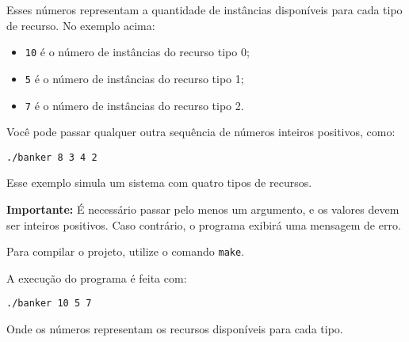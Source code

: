 \documentclass[12pt]{article}
\begin{document}
Esses números representam a quantidade de instâncias disponíveis para cada tipo de recurso. No exemplo acima:

\begin{itemize}
  \item \texttt{10} é o número de instâncias do recurso tipo 0;
  \item \texttt{5} é o número de instâncias do recurso tipo 1;
  \item \texttt{7} é o número de instâncias do recurso tipo 2.
\end{itemize}

Você pode passar qualquer outra sequência de números inteiros positivos, como:

\begin{lstlisting}
./banker 8 3 4 2
\end{lstlisting}

Esse exemplo simula um sistema com quatro tipos de recursos.

\textbf{Importante:} É necessário passar pelo menos um argumento, e os valores devem ser inteiros positivos. Caso contrário, o programa exibirá uma mensagem de erro.

Para compilar o projeto, utilize o comando \texttt{make}.

A execução do programa é feita com:

\begin{lstlisting}
./banker 10 5 7
\end{lstlisting}

Onde os números representam os recursos disponíveis para cada tipo.
\end{document}
